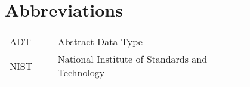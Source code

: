 \chapter*{Abbreviations}

\begin{flushleft}
\begin{tabular}{l p{0.8\linewidth}}
ADT      & Abstract Data Type\\
NIST	 & National Institute of Standards and Technology
\end{tabular}
\end{flushleft}

